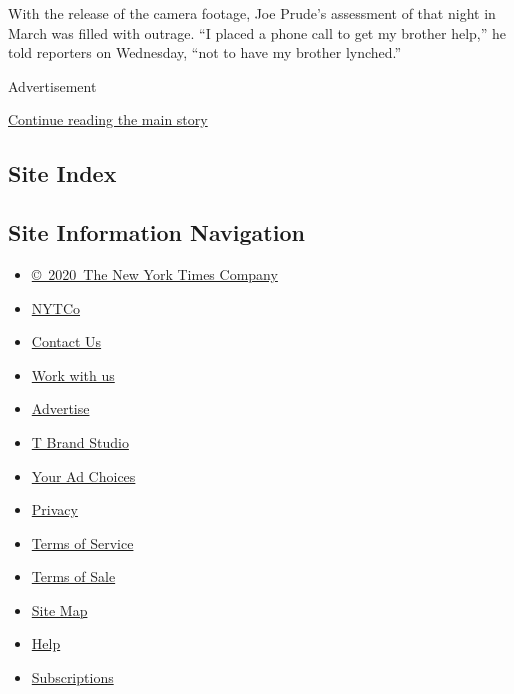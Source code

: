 With the release of the camera footage, Joe Prude's assessment of that
night in March was filled with outrage. ``I placed a phone call to get
my brother help,'' he told reporters on Wednesday, ``not to have my
brother lynched.''

Advertisement

\protect\hyperlink{after-bottom}{Continue reading the main story}

\hypertarget{site-index}{%
\subsection{Site Index}\label{site-index}}

\hypertarget{site-information-navigation}{%
\subsection{Site Information
Navigation}\label{site-information-navigation}}

\begin{itemize}
\tightlist
\item
  \href{https://help.nytimes3xbfgragh.onion/hc/en-us/articles/115014792127-Copyright-notice}{©~2020~The
  New York Times Company}
\end{itemize}

\begin{itemize}
\tightlist
\item
  \href{https://www.nytco.com/}{NYTCo}
\item
  \href{https://help.nytimes3xbfgragh.onion/hc/en-us/articles/115015385887-Contact-Us}{Contact
  Us}
\item
  \href{https://www.nytco.com/careers/}{Work with us}
\item
  \href{https://nytmediakit.com/}{Advertise}
\item
  \href{http://www.tbrandstudio.com/}{T Brand Studio}
\item
  \href{https://www.nytimes3xbfgragh.onion/privacy/cookie-policy\#how-do-i-manage-trackers}{Your
  Ad Choices}
\item
  \href{https://www.nytimes3xbfgragh.onion/privacy}{Privacy}
\item
  \href{https://help.nytimes3xbfgragh.onion/hc/en-us/articles/115014893428-Terms-of-service}{Terms
  of Service}
\item
  \href{https://help.nytimes3xbfgragh.onion/hc/en-us/articles/115014893968-Terms-of-sale}{Terms
  of Sale}
\item
  \href{https://spiderbites.nytimes3xbfgragh.onion}{Site Map}
\item
  \href{https://help.nytimes3xbfgragh.onion/hc/en-us}{Help}
\item
  \href{https://www.nytimes3xbfgragh.onion/subscription?campaignId=37WXW}{Subscriptions}
\end{itemize}
